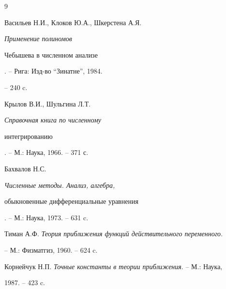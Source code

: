 \begin{thebibliography}{9}







Васильев Н.И., Клоков Ю.А., Шкерстена А.Я. {\em Применение полиномов


Чебышева в численном анализе}. -- Рига: Изд-во ``Зинатне'', 1984.


-- 240 c.




Крылов В.И., Шульгина Л.Т. {\em Справочная книга по численному


интегрированию}. -- М.: Наука, 1966. -- 371 с.




Бахвалов Н.С. {\em Численные методы. Анализ, алгебра,


обыкновенные дифференциальные уравнения}. -- М.: Наука, 1973. -- 631 c.




Тиман А.Ф. {\em Теория приближения функций действительного переменного}.


-- М.: Физматгиз, 1960. -- 624 c.




Корнейчук Н.П. {\em Точные константы в теории приближения}. -- М.: Наука,


1987. -- 423 c.





\end{thebibliography}





\vskip 0.5cm














\label{end}





